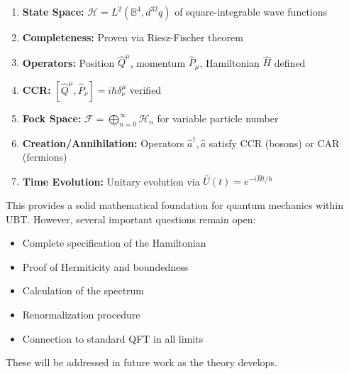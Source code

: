 \begin{enumerate}
\item \textbf{State Space:} $\mathcal{H} = L^2(\mathbb{B}^4, d^{32}q)$ of square-integrable wave functions
\item \textbf{Completeness:} Proven via Riesz-Fischer theorem
\item \textbf{Operators:} Position $\hat{Q}^{\mu}$, momentum $\hat{P}_{\mu}$, Hamiltonian $\hat{H}$ defined
\item \textbf{CCR:} $[\hat{Q}^{\mu}, \hat{P}_{\nu}] = i\hbar \delta^{\mu}_{\nu}$ verified
\item \textbf{Fock Space:} $\mathcal{F} = \bigoplus_{n=0}^{\infty} \mathcal{H}_n$ for variable particle number
\item \textbf{Creation/Annihilation:} Operators $\hat{a}^{\dagger}, \hat{a}$ satisfy CCR (bosons) or CAR (fermions)
\item \textbf{Time Evolution:} Unitary evolution via $\hat{U}(t) = e^{-i\hat{H}t/\hbar}$
\end{enumerate}

This provides a solid mathematical foundation for quantum mechanics within UBT. However, several important questions remain open:
\begin{itemize}
\item Complete specification of the Hamiltonian
\item Proof of Hermiticity and boundedness
\item Calculation of the spectrum
\item Renormalization procedure
\item Connection to standard QFT in all limits
\end{itemize}

These will be addressed in future work as the theory develops.
